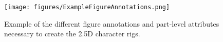 










\begin{figure}[ht]
\centering
\texttt{[image: figures/ExampleFigureAnnotations.png]}
\caption{Example of the different figure annotations and part-level attributes necessary to create the 2.5D character rigs.}
\label{fig:example_annotations}
\end{figure}


